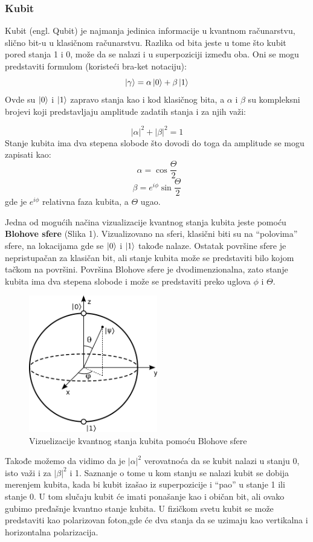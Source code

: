 \documentclass[12pt, letterpaper, oneside]{article}
\begin{document}
\subsubsection*{Kubit}
Kubit (engl. Qubit) je najmanja jedinica informacije u kvantnom računarstvu, slično bit-u u klasičnom računarstvu.
Razlika od bita jeste u tome što kubit pored stanja 1 i 0, može da se nalazi i u superpoziciji između oba.
Oni se mogu predstaviti formulom (koristeći bra-ket notaciju):
\[ \ket{\gamma} =  \alpha\ket{0}+\beta\ket{1} \]
Ovde su $\ket{0}$ i $\ket{1}$ zapravo stanja kao i kod klasičnog bita, a $\alpha$ i $\beta$ su kompleksni brojevi koji predstavljaju amplitude zadatih stanja i za njih važi:

\[ |\alpha|^2+|\beta|^2 = 1 \]
Stanje kubita ima dva stepena slobode što dovodi do toga da amplitude se mogu zapisati kao:
\[
    \alpha = \cos{\frac{\Theta}{2}} 
\]
\[
    \beta = e^{i\phi}\sin{\frac{\Theta}{2}}
\]
gde je $e^{i\phi}$ relativna faza kubita, a $\Theta$ ugao.

Jedna od mogućih načina vizualizacije kvantnog stanja kubita jeste pomoću \textbf{Blohove sfere} (Slika 1).
Vizualizovano na sferi, klasični biti su na ``polovima'' sfere, na lokacijama gde se $\Ket{0}$ i $\Ket{1}$  takođe nalaze.
Ostatak površine sfere je nepristupačan za klasičan bit, ali stanje kubita može se predstaviti bilo kojom tačkom na površini.
Površina Blohove sfere je dvodimenzionalna, zato stanje kubita ima dva stepena slobode i može se predstaviti preko uglova $\phi$ i $\Theta$.
\begin{figure}[ht]
    \centering
    \includegraphics[width=0.5\textwidth]{files/Bloch_sphere.png}
    \caption{Vizuelizacije kvantnog stanja kubita pomoću Blohove sfere\cite{BlochSphereImage}}
\end{figure}

Takođe možemo da vidimo da je $|\alpha|^2$ verovatnoća da se kubit nalazi u stanju 0, isto važi i za $ |\beta|^2$ i 1.
Saznanje o tome u kom stanju se nalazi kubit se dobija merenjem kubita, kada bi kubit izašao iz superpozicije i ``pao'' u stanje 1 ili stanje 0. U tom slučaju kubit će imati ponašanje kao i običan bit, ali ovako gubimo pređašnje kvantno stanje kubita.
U fizičkom svetu kubit se može predstaviti kao polarizovan foton,gde će dva stanja da se uzimaju kao vertikalna i horizontalna polarizacija.
\end{document}
